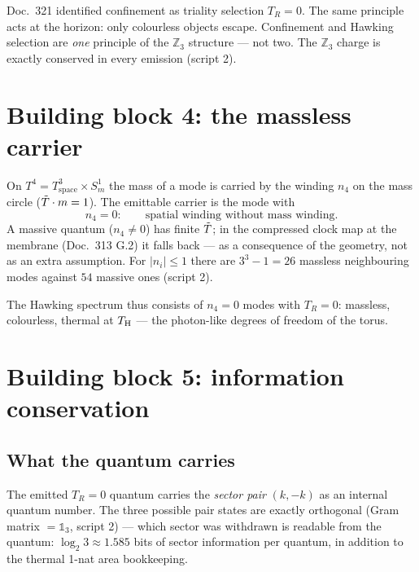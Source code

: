 \begin{tcolorbox}[ffgftbox, title={Confinement $=$ Hawking selection \B}]
  Doc.\ 321 identified confinement as triality selection $T_R = 0$.
  The same principle acts at the horizon: only colourless objects
  escape. Confinement and Hawking selection are \emph{one} principle
  of the $\mathbb{Z}_3$ structure — not two.
  The $\mathbb{Z}_3$ charge is exactly conserved in every emission
  (script 2).
\end{tcolorbox}

\section{Building block 4: the massless carrier}

On $T^4 = T^3_{\mathrm{space}}\times S^1_m$ the mass of a mode is
carried by the winding $n_4$ on the mass circle ($\tilde{T}\cdot m = 1$).
The emittable carrier is the mode with
\begin{equation}
  n_4 = 0:\qquad \text{spatial winding without mass winding.}
\end{equation}
A massive quantum ($n_4 \neq 0$) has finite $\tilde{T}$; in the
compressed clock map at the membrane (Doc.\ 313 G.2) it falls back —
as a consequence of the geometry, not as an extra assumption.
For $|n_i| \leq 1$ there are $3^3 - 1 = 26$ massless neighbouring
modes against $54$ massive ones (script 2). \K

The Hawking spectrum thus consists of $n_4 = 0$ modes with $T_R = 0$:
massless, colourless, thermal at $T_{\mathrm{H}}$ — the photon-like degrees of
freedom of the torus.

\section{Building block 5: information conservation}

\subsection{What the quantum carries}\label{sec:quant}

The emitted $T_R = 0$ quantum carries the \emph{sector pair} $(k, -k)$
as an internal quantum number. The three possible pair states are
exactly orthogonal (Gram matrix $= \mathbb{1}_3$, script 2) — which
sector was withdrawn is readable from the quantum:
$\log_2 3 \approx 1.585$ bits of sector information per quantum,
in addition to the thermal 1-nat area bookkeeping.

